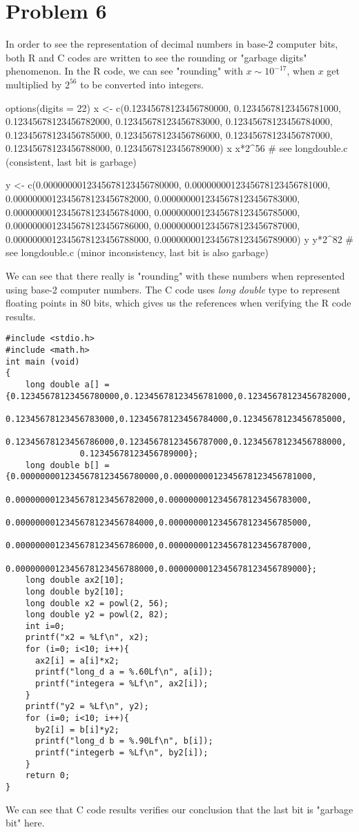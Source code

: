 \documentclass{article}
\begin{document}
\newpage
\section*{Problem 6}
In order to  see the representation of decimal numbers in base-2 computer bits, both R and C codes are
written to see the rounding or "garbage digits" phenomenon.
In the R code, we can see "rounding" with $x \sim 10^{-17}$, 
when $x$ get multiplied by $2^{56}$ to be converted into integers.

options(digits = 22)
x <- c(0.12345678123456780000, 0.12345678123456781000,
       0.12345678123456782000, 0.12345678123456783000,
       0.12345678123456784000, 0.12345678123456785000,
       0.12345678123456786000, 0.12345678123456787000,
       0.12345678123456788000, 0.12345678123456789000)
x
x*2^56 # see longdouble.c (consistent, last bit is garbage)

y <- c(0.0000000012345678123456780000, 0.0000000012345678123456781000,
       0.0000000012345678123456782000, 0.0000000012345678123456783000,
       0.0000000012345678123456784000, 0.0000000012345678123456785000,
       0.0000000012345678123456786000, 0.0000000012345678123456787000,
       0.0000000012345678123456788000, 0.0000000012345678123456789000)
y
y*2^82 # see longdouble.c (minor inconsistency, last bit is also garbage)



We can see that there really is "rounding" with these numbers when represented using
base-2 computer numbers. The C code uses \textit{long double} type to represent floating points in 80 bits, 
which gives us the references when verifying the R code results.

\begin{lstlisting}
#include <stdio.h>
#include <math.h>
int main (void)
{
	long double a[] = {0.12345678123456780000,0.12345678123456781000,0.12345678123456782000,
			   0.12345678123456783000,0.12345678123456784000,0.12345678123456785000,
			   0.12345678123456786000,0.12345678123456787000,0.12345678123456788000,
			   0.12345678123456789000};
	long double b[] = {0.0000000012345678123456780000,0.0000000012345678123456781000,
			   0.0000000012345678123456782000,0.0000000012345678123456783000,
			   0.0000000012345678123456784000,0.0000000012345678123456785000,
			   0.0000000012345678123456786000,0.0000000012345678123456787000,
			   0.0000000012345678123456788000,0.0000000012345678123456789000};
	long double ax2[10];
	long double by2[10];
	long double x2 = powl(2, 56);
	long double y2 = powl(2, 82);
	int i=0;
	printf("x2 = %Lf\n", x2);
	for (i=0; i<10; i++){
	  ax2[i] = a[i]*x2;
	  printf("long_d a = %.60Lf\n", a[i]);
	  printf("integera = %Lf\n", ax2[i]);
	}
	printf("y2 = %Lf\n", y2);
	for (i=0; i<10; i++){
	  by2[i] = b[i]*y2;
	  printf("long_d b = %.90Lf\n", b[i]);
	  printf("integerb = %Lf\n", by2[i]);
	}
	return 0;
}
\end{lstlisting}
\hbox{}


We can see that C code results verifies our conclusion that the last bit is "garbage bit" here.
\end{document}
